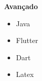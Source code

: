 \documentclass[10pt,a4paper,ragged2e]{altacv}
\begin{document}
{\Large \textbf{Avançado}\par\par}
\vspace{5pt}
\begin{itemize}
\item Java
\item Flutter
\item Dart 
\item Latex
\end{itemize} 






\clearpage







\end{document}
